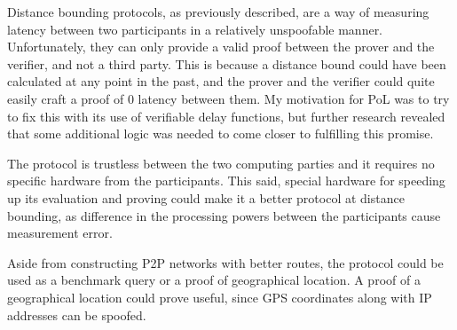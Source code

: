 Distance bounding protocols, as previously described, are a way of measuring latency between two participants in a relatively unspoofable manner. Unfortunately, they can only provide a valid proof between the prover and the verifier, and not a third party. This is because a distance bound could have been calculated at any point in the past, and the prover and the verifier could quite easily craft a proof of 0 latency between them. My motivation for PoL was to try to fix this with its use of verifiable delay functions, but further research revealed that some additional logic was needed to come closer to fulfilling this promise.

The protocol is trustless between the two computing parties and it requires no specific hardware from the participants. This said, special hardware for speeding up its evaluation and proving could make it a better protocol at distance bounding, as difference in the processing powers between the participants cause measurement error.

Aside from constructing P2P networks with better routes, the protocol could be used as a benchmark query or a proof of geographical location. A proof of a geographical location could prove useful, since GPS coordinates along with IP addresses can be spoofed.

